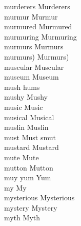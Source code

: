 murderers Murderers\\
murmur Murmur\\
murmured Murmured\\
murmuring Murmuring\\
murmurs Murmurs\\
murmurs) Murmurs)\\
muscular Muscular\\
museum Museum\\
mush hums\\
mushy Mushy\\
music Music\\
musical Musical\\
muslin Muslin\\
must Must smut\\
mustard Mustard\\
mute Mute\\
mutton Mutton\\
muy yum Yum\\
my My\\
mysterious Mysterious\\
mystery Mystery\\
myth Myth\\

